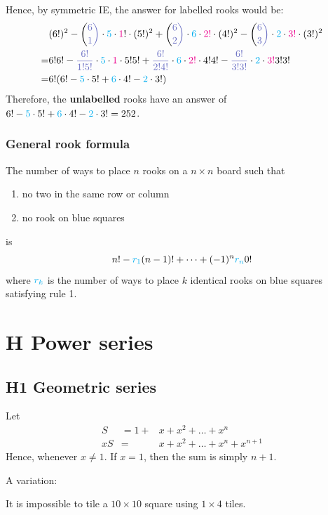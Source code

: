 \documentclass[12pt]{article}
\begin{document}
Hence, by symmetric IE, the answer for labelled rooks would be: \begin{align*}
    &(6!)^2-\pt{6\choose 1}\cdot \bt{5}\cdot \rt 1!\cdot (5!)^2 + \pt{6\choose 2}\cdot \bt{6}\cdot \rt{2!}\cdot (4!)^2 -\pt{6\choose 3}\cdot \bt{2}\cdot \rt{3!}\cdot (3!)^2\\
    =& 6!6! - \pt{\frac{6!}{1!5!}}\cdot \bt{5}\cdot \rt{1}\cdot5!5!+\pt{\frac{6!}{2!4!}}\cdot\bt{6}\cdot\rt{2!}\cdot4!4! - \pt{\frac{6!}{3!3!}}\cdot\bt{2}\cdot \rt{3!}3!3!\\
    =& 6!(6!-\bt{5}\cdot5!+\bt{6}\cdot4!-\bt{2}\cdot3!)
\end{align*}
Therefore, the \textbf{unlabelled} rooks have an answer of $6!-\textcolor{cyan}{5}\cdot5!+\textcolor{cyan}{6}\cdot4!-\textcolor{cyan}{2}\cdot3!=252$.

\subsubsection{General rook formula}
The number of ways to place $n$ rooks on a $n\times n$ board such that \begin{enumerate}
    \item no two in the same row or column
    \item no rook on blue squares\end{enumerate}
is \[n!-\textcolor{cyan}{r_1}(n-1)!+\dots+(-1)^n\textcolor{cyan}{r_n}0!\] where $\textcolor{cyan}{r_k}$ is the number of ways to place $k$ identical rooks on blue squares satisfying rule 1.

\section{H Power series}
\subsection{H1 Geometric series}
Let $$\begin{matrix}
    S &= 1+&x+x^2+\dots + x^n\\
    xS &= &x+x^2+\dots + x^n +x^{n+1}
\end{matrix}$$
Hence,  whenever $x\neq 1$. If $x=1$, then the sum is simply $n+1$.

\rmk A variation: 

\begin{theorem}
    It is impossible to tile a $10\times 10$ square using $1\times 4$ tiles.
\end{theorem}
\end{document}
